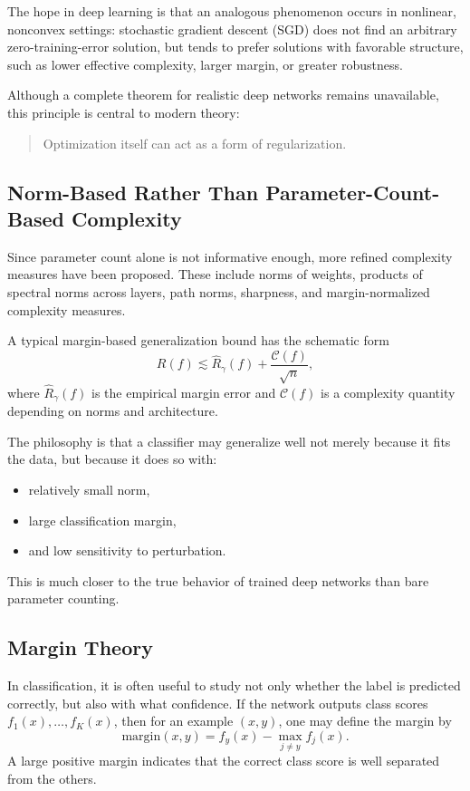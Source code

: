 The hope in deep learning is that an analogous phenomenon occurs in nonlinear, nonconvex settings: stochastic gradient descent (SGD) does not find an arbitrary zero-training-error solution, but tends to prefer solutions with favorable structure, such as lower effective complexity, larger margin, or greater robustness.

Although a complete theorem for realistic deep networks remains unavailable, this principle is central to modern theory:

\begin{quote}
Optimization itself can act as a form of regularization.
\end{quote}

\subsection{Norm-Based Rather Than Parameter-Count-Based Complexity}

Since parameter count alone is not informative enough, more refined complexity measures have been proposed. These include norms of weights, products of spectral norms across layers, path norms, sharpness, and margin-normalized complexity measures.

A typical margin-based generalization bound has the schematic form
\[
R(f) \lesssim \hat{R}_\gamma(f) + \frac{\mathcal{C}(f)}{\sqrt{n}},
\]
where \( \hat{R}_\gamma(f) \) is the empirical margin error and \( \mathcal{C}(f) \) is a complexity quantity depending on norms and architecture.

The philosophy is that a classifier may generalize well not merely because it fits the data, but because it does so with:
\begin{itemize}
    \item relatively small norm,
    \item large classification margin,
    \item and low sensitivity to perturbation.
\end{itemize}

This is much closer to the true behavior of trained deep networks than bare parameter counting.

\subsection{Margin Theory}

In classification, it is often useful to study not only whether the label is predicted correctly, but also with what confidence. If the network outputs class scores \(f_1(x),\dots,f_K(x)\), then for an example \((x,y)\), one may define the margin by
\[
\mathrm{margin}(x,y)= f_y(x)-\max_{j\neq y} f_j(x).
\]
A large positive margin indicates that the correct class score is well separated from the others.


